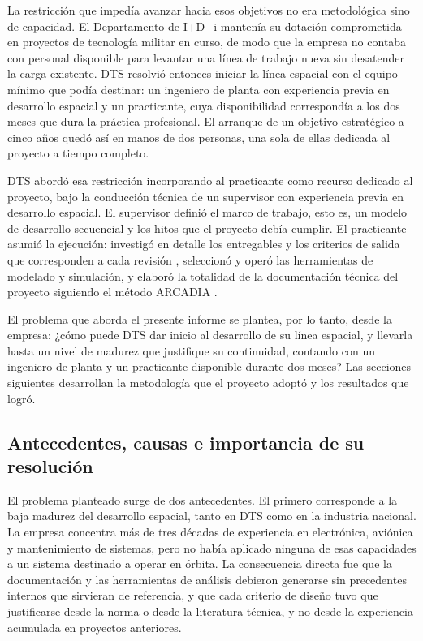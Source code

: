 La restricción que impedía avanzar hacia esos objetivos no era metodológica sino de capacidad. El Departamento de I+D+i mantenía su dotación comprometida en proyectos de tecnología militar en curso, de modo que la empresa no contaba con personal disponible para levantar una línea de trabajo nueva sin desatender la carga existente. DTS resolvió entonces iniciar la línea espacial con el equipo mínimo que podía destinar: un ingeniero de planta con experiencia previa en desarrollo espacial y un practicante, cuya disponibilidad correspondía a los dos meses que dura la práctica profesional. El arranque de un objetivo estratégico a cinco años quedó así en manos de dos personas, una sola de ellas dedicada al proyecto a tiempo completo.

DTS abordó esa restricción incorporando al practicante como recurso dedicado al proyecto, bajo la conducción técnica de un supervisor con experiencia previa en desarrollo espacial. El supervisor definió el marco de trabajo, esto es, un modelo de desarrollo secuencial y los hitos que el proyecto debía cumplir. El practicante asumió la ejecución: investigó en detalle los entregables y los criterios de salida que corresponden a cada revisión \parencite{ieee15288-2}, seleccionó y operó las herramientas de modelado y simulación, y elaboró la totalidad de la documentación técnica del proyecto siguiendo el método ARCADIA \parencite{roques}.

El problema que aborda el presente informe se plantea, por lo tanto, desde la empresa: ¿cómo puede DTS dar inicio al desarrollo de su línea espacial, y llevarla hasta un nivel de madurez que justifique su continuidad, contando con un ingeniero de planta y un practicante disponible durante dos meses? Las secciones siguientes desarrollan la metodología que el proyecto adoptó y los resultados que logró.


\subsection{Antecedentes, causas e importancia de su resolución}

El problema planteado surge de dos antecedentes. El primero corresponde a la baja madurez del desarrollo espacial, tanto en DTS como en la industria nacional. La empresa concentra más de tres décadas de experiencia en electrónica, aviónica y mantenimiento de sistemas, pero no había aplicado ninguna de esas capacidades a un sistema destinado a operar en órbita. La consecuencia directa fue que la documentación y las herramientas de análisis debieron generarse sin precedentes internos que sirvieran de referencia, y que cada criterio de diseño tuvo que justificarse desde la norma o desde la literatura técnica, y no desde la experiencia acumulada en proyectos anteriores.

